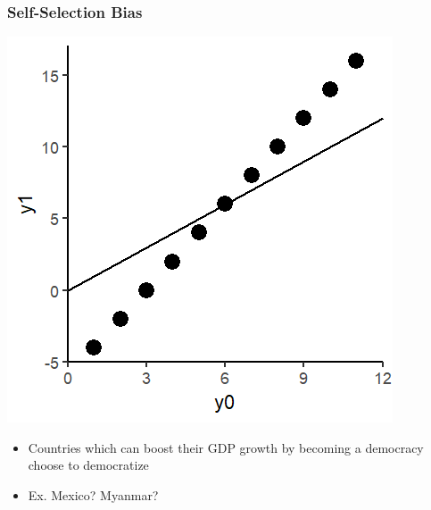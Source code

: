 \documentclass[xcolor=x11names,compress]{beamer}\usepackage[]{graphicx}\usepackage[]{color}
\makeatletter
\def\maxwidth{ %
  \ifdim\Gin@nat@width>\linewidth
    \linewidth
  \else
    \Gin@nat@width
  \fi
}
\newenvironment{knitrout}{}{} %
\renewcommand{\(}{\begin{columns}}
\renewcommand{\)}{\end{columns}}
\newcommand{\<}[1]{\begin{column}{#1}}
\renewcommand{\>}{\end{column}}
\makeatother
\begin{document}
\begin{frame}
\frametitle{Self-Selection Bias}
\begin{knitrout}
\color{fgcolor}
\includegraphics[width=\maxwidth]{figure/SSB1-1} 

\end{knitrout}
\begin{itemize}
\pause
\item Countries which can boost their GDP growth by becoming a democracy choose to democratize
\pause
\item Ex. Mexico? Myanmar?
\end{itemize}
\end{frame}
\end{document}
